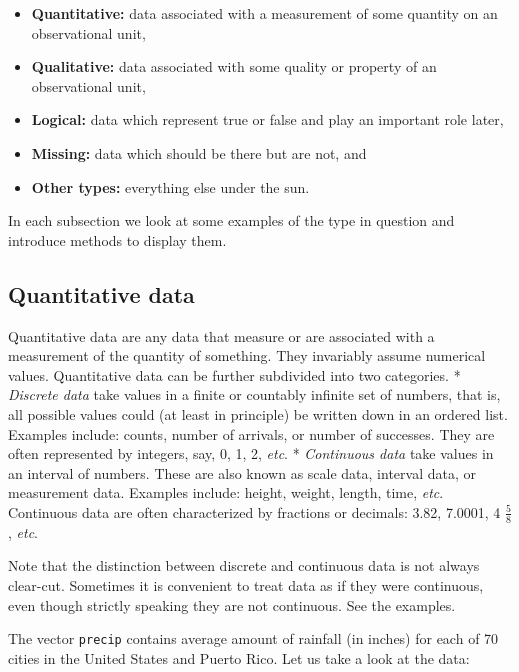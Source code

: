 \documentclass[]{book}
\providecommand{\tightlist}{%
  \setlength{\itemsep}{0pt}\setlength{\parskip}{0pt}}
\numberwithin{equation}{chapter}
\numberwithin{figure}{chapter}
\theoremstyle{plain}
\theoremstyle{definition}
\theoremstyle{remark}
\theoremstyle{definition}
\theoremstyle{definition}
\theoremstyle{remark}
\let\BeginKnitrBlock\begin \let\EndKnitrBlock\end
\begin{document}
\begin{itemize}
\tightlist
\item
  \textbf{Quantitative:} data associated with a measurement of some
  quantity on an observational unit,
\item
  \textbf{Qualitative:} data associated with some quality or property of
  an observational unit,
\item
  \textbf{Logical:} data which represent true or false and play an
  important role later,
\item
  \textbf{Missing:} data which should be there but are not, and
\item
  \textbf{Other types:} everything else under the sun.
\end{itemize}

In each subsection we look at some examples of the type in question and
introduce methods to display them.

\subsection{Quantitative data}\label{sub-quantitative-data}

Quantitative data are any data that measure or are associated with a
measurement of the quantity of something. They invariably assume
numerical values. Quantitative data can be further subdivided into two
categories. * \emph{Discrete data} take values in a finite or countably
infinite set of numbers, that is, all possible values could (at least in
principle) be written down in an ordered list. Examples include: counts,
number of arrivals, or number of successes. They are often represented
by integers, say, 0, 1, 2, \emph{etc}. * \emph{Continuous data} take
values in an interval of numbers. These are also known as scale data,
interval data, or measurement data. Examples include: height, weight,
length, time, \emph{etc}. Continuous data are often characterized by
fractions or decimals: 3.82, 7.0001, 4 \(\frac{5}{8}\), \emph{etc}.

Note that the distinction between discrete and continuous data is not
always clear-cut. Sometimes it is convenient to treat data as if they
were continuous, even though strictly speaking they are not continuous.
See the examples.

\bigskip

\BeginKnitrBlock{example}[Annual Precipitation in US Cities]
\protect\hypertarget{ex:unnamed-chunk-25}{}{\label{ex:unnamed-chunk-25}
\iffalse (Annual Precipitation in US Cities) \fi }The vector
\texttt{precip}  contains
average amount of rainfall (in inches) for each of 70 cities in the
United States and Puerto Rico. Let us take a look at the data:
\EndKnitrBlock{example}
\end{document}
